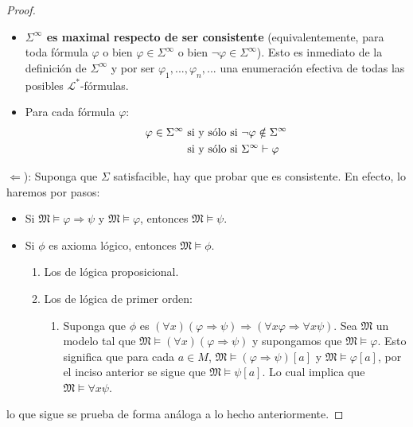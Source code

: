 \documentclass[12pt]{report}
\newcounter{it}
\theoremstyle{largebreak}
\begin{document}
\begin{proof}
\begin{enumerate}[label = \textit{(\alph*)}]
\begin{itemize}
                \item \textbf{$\Sigma^\infty$ es maximal respecto de ser consistente} (equivalentemente, para toda fórmula $\varphi$ o bien $\varphi\in\Sigma^\infty$ o bien $\neg\varphi\in\Sigma^\infty$). Esto es inmediato de la definición de $\Sigma^\infty$ y por ser $\varphi_1,...,\varphi_n,...$ una enumeración efectiva de todas las posibles $\mathcal{L}^*$-fórmulas.
                \item Para cada fórmula $\varphi$:
                \begin{equation*}
                    \begin{split}
                        \varphi\in\Sigma^\infty &\textup{ si y sólo si }\neg\varphi\notin\Sigma^\infty\\
                        &\textup{ si y sólo si }\Sigma^\infty\vdash\varphi \\
                    \end{split}
                \end{equation*}
            \end{itemize}
        \end{enumerate}

        $\Leftarrow$): Suponga que $\Sigma$ satisfacible, hay que probar que es consistente. En efecto, lo haremos por pasos:
        \begin{itemize}
            \item Si $\mathfrak{M}\vDash\varphi\Rightarrow\psi$ y $\mathfrak{M}\vDash\varphi$, entonces $\mathfrak{M}\vDash\psi$.
            \item Si $\phi$ es axioma lógico, entonces $\mathfrak{M}\vDash\phi$.
            \begin{enumerate}[label = \textit{(\alph*)}]
                \item Los de lógica proposicional.
                \item Los de lógica de primer orden:
                \begin{enumerate}[label = \textit{(\arabic*)}]
                    \item Suponga que $\phi$ es $(\forall x)(\varphi\Rightarrow\psi)\Rightarrow (\forall x\varphi\Rightarrow\forall x\psi)$. Sea $\mathfrak{M}$ un modelo tal que $\mathfrak{M}\vDash(\forall x)(\varphi\Rightarrow\psi)$ y supongamos que $\mathfrak{M}\vDash\varphi$. Esto significa que para cada $a\in M$, $\mathfrak{M}\vDash(\varphi\Rightarrow\psi)[a]$ y $\mathfrak{M}\vDash\varphi[a]$, por el inciso anterior se sigue que $\mathfrak{M}\vDash\psi[a]$. Lo cual implica que $\mathfrak{M}\vDash\forall x\psi$.
                \end{enumerate}
            \end{enumerate}
        \end{itemize}
        lo que sigue se prueba de forma análoga a lo hecho anteriormente.
    \end{proof}
\end{document}
